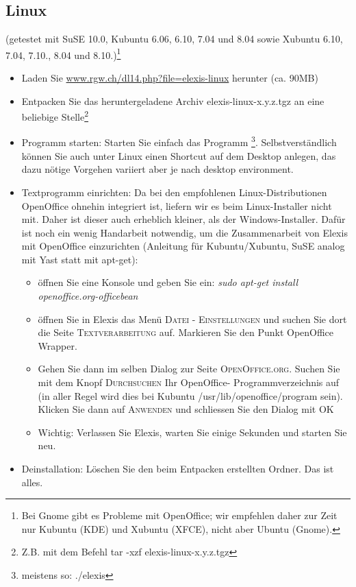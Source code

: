 \subsection{Linux}
(getestet mit SuSE 10.0, Kubuntu 6.06, 6.10, 7.04 und 8.04 sowie  Xubuntu 6.10, 7.04, 7.10., 8.04 und 8.10.)\footnote{Bei Gnome gibt es Probleme mit OpenOffice; wir empfehlen daher zur Zeit nur Kubuntu (KDE) und Xubuntu (XFCE), nicht aber Ubuntu (Gnome).}
\begin{itemize}
	\item Laden Sie \href{http://www.rgw.ch/dl14.php?file=elexis-linux}{www.rgw.ch/dl14.php?file=elexis-linux} herunter (ca. 90MB)
	\item Entpacken Sie das	heruntergeladene Archiv	elexis-linux-x.y.z.tgz an eine beliebige Stelle\footnote{Z.B. mit dem Befehl tar -xzf elexis-linux-x.y.z.tgz}
    \item Programm starten: Starten Sie einfach das Programm \footnote{meistens so: ./elexis}. Selbstverständlich können Sie auch unter Linux einen Shortcut auf dem Desktop
    anlegen, das dazu nötige Vorgehen variiert aber je nach desktop environment.

 	\item Textprogramm einrichten: Da bei den empfohlenen Linux-Distributionen
 	Open\-Of\-fi\-ce ohnehin integriert ist, liefern wir es beim Linux-Installer nicht
 	mit. Daher ist dieser auch erheblich kleiner, als der Windows-Installer. Dafür
 	ist noch ein wenig 	\glqq Handarbeit\grqq{} notwendig, um die Zusammenarbeit
 	von Elexis mit OpenOffice einzurichten (Anleitung für Kubuntu/Xubuntu, SuSE
 	analog mit Yast statt mit apt-get):
	\begin{itemize}
	 	\item öffnen Sie eine Konsole und geben Sie ein: \textit{sudo apt-get in\-stall
	 	openoffice.org-office\-bean}
		\item öffnen Sie in Elexis das Menü \textsc{Datei - Einstellungen} und suchen
		Sie dort die Seite \textsc{Textverarbeitung} auf. Markieren Sie den Punkt
		\glqq Open\-Of\-fice Wrap\-per\grqq{}.
		\item Gehen Sie dann im selben Dialog zur Seite \textsc{OpenOffice.org}.
		Suchen Sie mit dem Knopf \textsc{Durchsuchen} Ihr OpenOffice-
		Programmverzeichnis auf (in aller Regel wird dies bei Kubuntu
		/usr/lib/openoffice/program sein). Klicken Sie dann auf \textsc{Anwenden} und
		schliessen Sie den Dialog mit \textsc{OK}
		\item Wichtig: Verlassen Sie Elexis, warten Sie einige Sekunden und starten
		Sie neu.
    \end{itemize}
  \item Deinstallation: Löschen Sie den beim Entpacken erstellten Ordner. Das
 ist alles.
\end{itemize}

